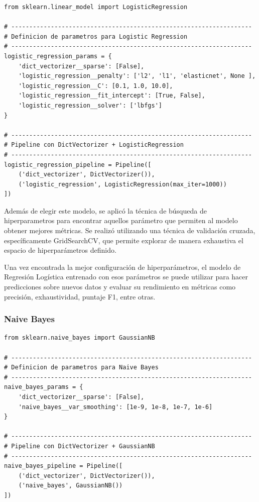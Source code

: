 \documentclass[11pt,a4paper,spanish]{book}
\numberwithin{equation}{chapter}
\numberwithin{figure}{chapter}
\begin{document}
\begin{lstlisting}
from sklearn.linear_model import LogisticRegression

# -------------------------------------------------------------------
# Definicion de parametros para Logistic Regression
# -------------------------------------------------------------------
logistic_regression_params = {
    'dict_vectorizer__sparse': [False],
    'logistic_regression__penalty': ['l2', 'l1', 'elasticnet', None ],
    'logistic_regression__C': [0.1, 1.0, 10.0],
    'logistic_regression__fit_intercept': [True, False],
    'logistic_regression__solver': ['lbfgs']
}

# -------------------------------------------------------------------
# Pipeline con DictVectorizer + LogisticRegression
# -------------------------------------------------------------------
logistic_regression_pipeline = Pipeline([
    ('dict_vectorizer', DictVectorizer()),
    ('logistic_regression', LogisticRegression(max_iter=1000))
])
\end{lstlisting}


Además de elegir este modelo, se aplicó la técnica de búsqueda de hiperparametros para encontrar aquellos parámetro que permiten al modelo obtener mejores métricas. Se realizó utilizando una técnica de validación cruzada, específicamente GridSearchCV, que permite explorar de manera exhaustiva el espacio de hiperparámetros definido.

Una vez encontrada la mejor configuración de hiperparámetros, el modelo de Regresión Logística entrenado con esos parámetros se puede utilizar para hacer predicciones sobre nuevos datos y evaluar su rendimiento en métricas como precisión, exhaustividad, puntaje F1, entre otras.


\subsubsection{Naive Bayes}


\begin{lstlisting}
from sklearn.naive_bayes import GaussianNB

# -------------------------------------------------------------------
# Definicion de parametros para Naive Bayes
# -------------------------------------------------------------------
naive_bayes_params = {
    'dict_vectorizer__sparse': [False],
    'naive_bayes__var_smoothing': [1e-9, 1e-8, 1e-7, 1e-6]
}

# -------------------------------------------------------------------
# Pipeline con DictVectorizer + GaussianNB
# -------------------------------------------------------------------
naive_bayes_pipeline = Pipeline([
    ('dict_vectorizer', DictVectorizer()),
    ('naive_bayes', GaussianNB())
])
\end{lstlisting}
\end{document}
